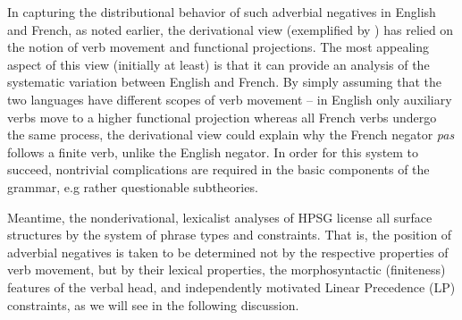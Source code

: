 \documentclass[output=paper
                ,modfonts
		,nonflat
	        ,collection
	        ,collectionchapter
	        ,collectiontoclongg
 	        ,biblatex  
                ,babelshorthands
                ,newtxmath
                ,draftmode
                ,colorlinks, citecolor=brown 
]{./langsci/langscibook}
\begin{document}
{\begin{exe}
\begin{xlist}
\begin{exe}
\begin{xlist}
In capturing the distributional behavior of such adverbial negatives
in English and French, as noted earlier, the derivational view (exemplified by \citep{Pollock:89, Chomsky:91})
has relied on the notion of verb
movement and functional projections.  The most appealing aspect of this
view (initially at least) is that it can provide an analysis of the
systematic variation
between English and French. By simply assuming that the
two languages have different scopes of verb movement -- in English
only auxiliary verbs move to a higher functional projection whereas
all French verbs undergo the same process, the derivational
view could explain why the French negator \textit{pas} follows
a finite verb, unlike the English negator.  In order for this system to succeed,
nontrivial complications are required in the basic components of the
grammar, e.g rather questionable subtheories.

Meantime, the nonderivational, lexicalist analyses of HPSG
license all surface structures by the system of phrase types
and constraints.  That is, the position of 
adverbial negatives is taken to be determined not by
the respective properties of verb movement, but by their lexical
properties, the morphosyntactic (finiteness) features of the verbal head,
and independently motivated Linear Precedence (LP) constraints, as
we will see in the following discussion. 

\end{xlist}
\end{exe}
\end{xlist}
\end{exe}}
\end{document}
